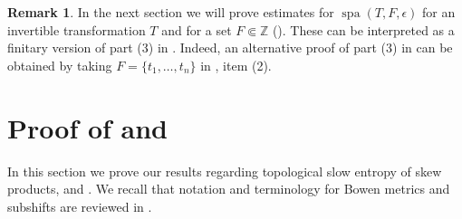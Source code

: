 \documentclass[a4paper,oneside]{amsart}
\renewcommand{\(}{\begin{dmath*}}
\renewcommand{\)}{\end{dmath*}}
\theoremstyle{definition}
\newtheorem{remark}{Remark}
\newcommand{\Z}{\mathbb{Z}}
\newcommand{\spa}{\operatorname{spa}}
\begin{document}
\begin{remark}
    In the next section we will prove  estimates for $\spa(T,F,\epsilon)$ for an invertible transformation $T$ and for a set $F\Subset\Z$ (). These can be interpreted as a finitary version of part (3) in . Indeed, an alternative proof of part (3) in  can be obtained by taking $F=\{t_1,\dots,t_n\}$ in , item (2). 
\end{remark}
\section{Proof of  and }\label{sec:slow-entropy}
In this section we prove our results regarding topological slow entropy of skew products,  and . We recall that notation and terminology for Bowen metrics and subshifts are reviewed in .
\end{document}
